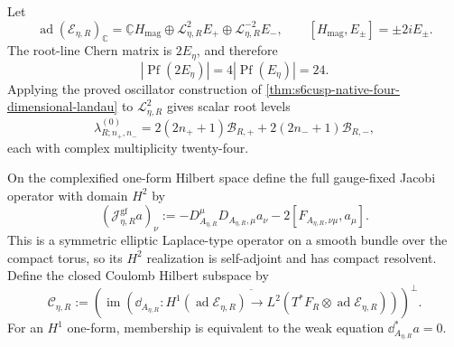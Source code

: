 Let
\begin{equation}\label{eq:s6cusp-native-adjoint-root-splitting}
 \operatorname{ad}(\mathcal E_{\eta,R})_{\mathbb C}
 =\underline{\mathbb C}H_{\mathrm{mag}}
 \oplus\mathcal L_{\eta,R}^{2}E_+
 \oplus\mathcal L_{\eta,R}^{-2}E_-,
 \qquad
 [H_{\mathrm{mag}},E_\pm]=\pm2iE_\pm.
\end{equation}
The root-line Chern matrix is \(2E_\eta\), and therefore
\begin{equation}\label{eq:s6cusp-native-root-pfaffian}
 \left|\operatorname{Pf}(2E_\eta)\right|
 =4\left|\operatorname{Pf}(E_\eta)\right|=24.
\end{equation}
Applying the proved oscillator construction of
\cref{thm:s6cusp-native-four-dimensional-landau} to
\(\mathcal L_{\eta,R}^{2}\) gives scalar root levels
\begin{equation}\label{eq:s6cusp-native-root-scalar-levels}
 \lambda^{(0)}_{R;n_+,n_-}
 =2(2n_++1)\mathcal B_{R,+}
  +2(2n_-+1)\mathcal B_{R,-},
\end{equation}
each with complex multiplicity twenty-four.

On the complexified one-form Hilbert space define the full gauge-fixed
Jacobi operator with domain \(H^2\) by
\begin{equation}\label{eq:s6cusp-native-full-jacobi}
 (\mathcal J^{\mathrm{gf}}_{\eta,R}a)_\nu
 :=-D_{A_{\eta,R}}^\mu D_{A_{\eta,R},\mu}a_\nu
   -2[F_{A_{\eta,R},\nu\mu},a_\mu].
\end{equation}
This is a symmetric elliptic Laplace-type operator on a smooth bundle over
the compact torus, so its \(H^2\) realization is self-adjoint and has compact
resolvent.  Define the closed Coulomb Hilbert subspace by
\begin{equation}\label{eq:s6cusp-native-Coulomb-Hilbert-space}
 \mathscr C_{\eta,R}:=
 \left(\overline{\operatorname{im}
  (\dd_{A_{\eta,R}}:H^1(\operatorname{ad}\mathcal E_{\eta,R})
   \longrightarrow L^2(T^*F_R\otimes\operatorname{ad}\mathcal E_{\eta,R}))}
 \right)^\perp.
\end{equation}
For an \(H^1\) one-form, membership is equivalent to the weak equation
\(\dd_{A_{\eta,R}}^*a=0\).

